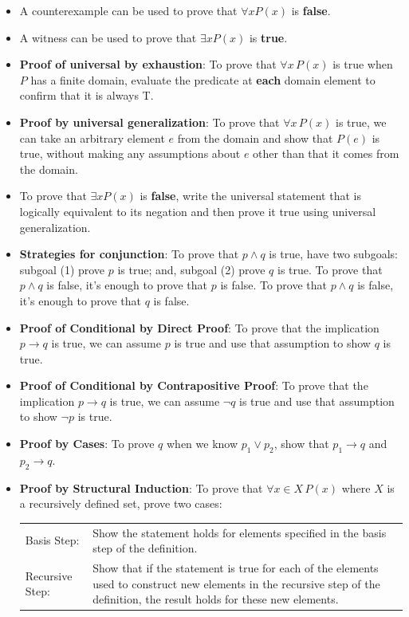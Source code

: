 \documentclass[12pt, oneside]{article}
\begin{document}
\begin{itemize}
    \item A counterexample can be used to prove that  $\forall x P(x)$ is {\bf false}.
    \item  A witness can be used  to  prove that  $\exists x P(x)$ is {\bf true}.
    \item {\bf Proof of universal by exhaustion}: To prove that $\forall x \, P(x)$
is true when $P$ has a finite domain, evaluate the predicate at {\bf each} domain element to confirm that it is always T.
    \item  {\bf Proof by universal generalization}: To prove that $\forall x \, P(x)$
is true, we can take an arbitrary element $e$ from the domain and show that $P(e)$ is true, without making any assumptions about $e$ other than that it comes from the domain.
    \item To  prove  that $\exists x P(x)$ is {\bf false}, write the universal statement that is logically equivalent to its negation and then prove it true using universal generalization.
    \item {\bf Strategies for conjunction}: To prove that $p \land q$ is true, have two subgoals: subgoal (1) prove $p$ 
is  true; and, subgoal (2) prove $q$ is true. To prove that $p \land q$ is false, it's enough to prove that $p$ is false.
 To prove that $p \land q$ is false, it's enough to prove that $q$ is false.
    \item {\bf Proof of Conditional by Direct Proof}: To prove that the implication $p \to q$ is true, we can assume $p$ is true and use that assumption to show $q$ is true.
    \item {\bf Proof of Conditional by Contrapositive Proof}: To prove that the implication $p \to q$ is true, we can assume $\neg q$ is true and use that assumption to show $\neg p$ is true.
    \item {\bf Proof by Cases}: To prove $q$ when we know $p_1 \lor p_2$, show that $p_1 \to q$ and $p_2 \to q$.
    \item
    {\bf Proof by Structural Induction}: To prove that $\forall x \in X \, P(x)$ where $X$ is a recursively defined set, prove two cases:
        
        \begin{tabularx}{\textwidth}{l X}
        Basis Step: & Show the statement holds for elements specified in the basis step of the definition. \\
        Recursive Step: & Show that if the statement is true for each of the elements used to construct
    new elements in the recursive step of the definition, the result holds for these new elements.
    \end{tabularx}
    

\end{itemize}
\end{document}
